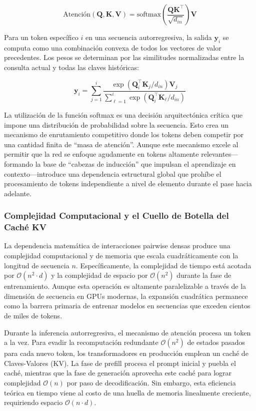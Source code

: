 \documentclass[11pt,a4paper]{article}
\begin{document}
$$
\text{Atención}(\mathbf{Q}, \mathbf{K}, \mathbf{V}) = \text{softmax}\left(\frac{\mathbf{Q}\mathbf{K}^\top}{\sqrt{d_{in}}}\right)\mathbf{V}
$$

Para un token específico $i$ en una secuencia autorregresiva, la salida $\mathbf{y}_i$ se computa como una combinación convexa de todos los vectores de valor precedentes. Los pesos se determinan por las similitudes normalizadas entre la consulta actual y todas las claves históricas:

$$
\mathbf{y}_i = \sum_{j=1}^i \frac{\exp(\mathbf{Q}_i^\top \mathbf{K}_j / d_{in}) \mathbf{V}_j}{\sum_{\ell=1}^i \exp(\mathbf{Q}_i^\top \mathbf{K}_\ell / d_{in})}
$$

La utilización de la función softmax es una decisión arquitectónica crítica que impone una distribución de probabilidad sobre la secuencia. Esto crea un mecanismo de enrutamiento competitivo donde los tokens deben competir por una cantidad finita de ``masa de atención''. Aunque este mecanismo excele al permitir que la red se enfoque agudamente en tokens altamente relevantes---formando la base de ``cabezas de inducción'' que impulsan el aprendizaje en contexto---introduce una dependencia estructural global que prohíbe el procesamiento de tokens independiente a nivel de elemento durante el pase hacia adelante.

\subsubsection{Complejidad Computacional y el Cuello de Botella del Caché KV}

La dependencia matemática de interacciones pairwise densas produce una complejidad computacional y de memoria que escala cuadráticamente con la longitud de secuencia $n$. Específicamente, la complejidad de tiempo está acotada por $\mathcal{O}(n^2 \cdot d)$ y la complejidad de espacio por $\mathcal{O}(n^2)$ durante la fase de entrenamiento. Aunque esta operación es altamente paralelizable a través de la dimensión de secuencia en GPUs modernas, la expansión cuadrática permanece como la barrera primaria de entrenar modelos en secuencias que exceden cientos de miles de tokens.

Durante la inferencia autorregresiva, el mecanismo de atención procesa un token a la vez. Para evadir la recomputación redundante $\mathcal{O}(n^2)$ de estados pasados para cada nuevo token, los transformadores en producción emplean un caché de Claves-Valores (KV). La fase de prefill procesa el prompt inicial y puebla el caché, mientras que la fase de generación aprovecha este caché para lograr complejidad $\mathcal{O}(n)$ por paso de decodificación. Sin embargo, esta eficiencia teórica en tiempo viene al costo de una huella de memoria linealmente creciente, requiriendo espacio $\mathcal{O}(n \cdot d)$.
\end{document}
